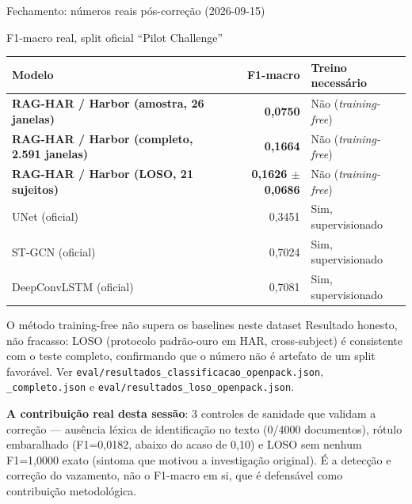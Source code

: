 \documentclass{beamer}
\newenvironment{numerobloco}[1]{\begin{block}{#1}}{\end{block}}
\newenvironment{decisaobloco}[1]{\begin{alertblock}{#1}}{\end{alertblock}}
\begin{document}
\begin{frame}{Fechamento: números reais pós-correção (2026-09-15)}
  \small
  \begin{numerobloco}{F1-macro real, split oficial ``Pilot Challenge''}
    \begin{center}
    \begin{tabular}{lrl}
      \toprule
      Modelo & F1-macro & Treino necessário \\
      \midrule
      \textbf{RAG-HAR / Harbor (amostra, 26 janelas)} & \textbf{0,0750} & Não (\emph{training-free}) \\
      \textbf{RAG-HAR / Harbor (completo, 2.591 janelas)} & \textbf{0,1664} & Não (\emph{training-free}) \\
      \textbf{RAG-HAR / Harbor (LOSO, 21 sujeitos)} & \textbf{0,1626 $\pm$ 0,0686} & Não (\emph{training-free}) \\
      \midrule
      UNet (oficial) & 0,3451 & Sim, supervisionado \\
      ST-GCN (oficial) & 0,7024 & Sim, supervisionado \\
      DeepConvLSTM (oficial) & 0,7081 & Sim, supervisionado \\
      \bottomrule
    \end{tabular}
    \end{center}
  \end{numerobloco}

  \pause
  \begin{decisaobloco}{O método training-free não supera os baselines neste dataset}
    Resultado honesto, não fracasso: LOSO (protocolo padrão-ouro em HAR, cross-subject) é
    consistente com o teste completo, confirmando que o número não é artefato de um split
    favorável. Ver \texttt{eval/resultados\_classificacao\_openpack.json},
    \texttt{\_completo.json} e \texttt{eval/resultados\_loso\_openpack.json}.
  \end{decisaobloco}

  \pause
  \textbf{A contribuição real desta sessão}: 3 controles de sanidade que validam a correção —
  ausência léxica de identificação no texto (0/4000 documentos), rótulo embaralhado
  (F1=0,0182, abaixo do acaso de 0,10) e LOSO sem nenhum F1=1,0000 exato (sintoma que motivou
  a investigação original). É a detecção e correção do vazamento, não o F1-macro em si, que é
  defensável como contribuição metodológica.
\end{frame}
\end{document}
